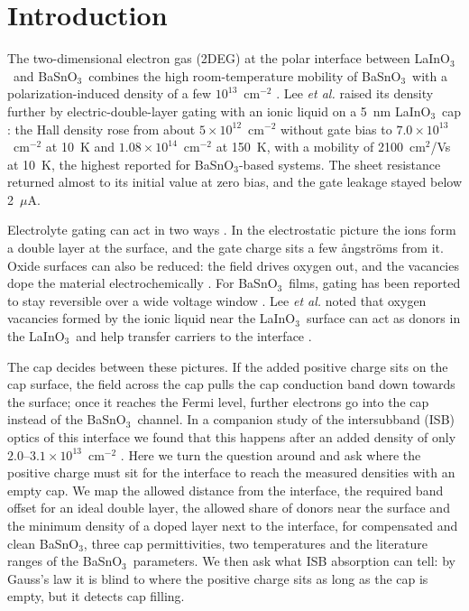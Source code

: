 \documentclass[11pt]{article}
\newcommand{\LIO}{\texorpdfstring{LaInO$_3$}{LaInO3}}
\newcommand{\BSO}{\texorpdfstring{BaSnO$_3$}{BaSnO3}}
\begin{document}
\section{Introduction}
The two-dimensional electron gas (2DEG) at the polar interface between \LIO\ and \BSO\ combines the high room-temperature mobility of \BSO\ with a polarization-induced density of a few $10^{13}$~cm$^{-2}$ \cite{Kim2019LIO,Aggoune2021}. Lee \emph{et al.} raised its density further by electric-double-layer gating with an ionic liquid on a 5~nm \LIO\ cap \cite{Lee2024LIO}: the Hall density rose from about $5\times10^{12}$~cm$^{-2}$ without gate bias to $7.0\times10^{13}$~cm$^{-2}$ at 10~K and $1.08\times10^{14}$~cm$^{-2}$ at 150~K, with a mobility of 2100~cm$^2$/Vs at 10~K, the highest reported for \BSO-based systems. The sheet resistance returned almost to its initial value at zero bias, and the gate leakage stayed below 2~$\mu$A.

Electrolyte gating can act in two ways \cite{Ueno2008,Bisri2017}. In the electrostatic picture the ions form a double layer at the surface, and the gate charge sits a few \aa ngstr\"oms from it. Oxide surfaces can also be reduced: the field drives oxygen out, and the vacancies dope the material electrochemically \cite{Jeong2013,Bisri2017}. For \BSO\ films, gating has been reported to stay reversible over a wide voltage window \cite{Wang2019BSO}. Lee \emph{et al.} noted that oxygen vacancies formed by the ionic liquid near the \LIO\ surface can act as donors in the \LIO\ and help transfer carriers to the interface \cite{Lee2024LIO}.

The cap decides between these pictures. If the added positive charge sits on the cap surface, the field across the cap pulls the cap conduction band down towards the surface; once it reaches the Fermi level, further electrons go into the cap instead of the \BSO\ channel. In a companion study of the intersubband (ISB) optics of this interface we found that this happens after an added density of only $2.0$--$3.1\times10^{13}$~cm$^{-2}$ \cite{OwnbyMAT01}. Here we turn the question around and ask where the positive charge must sit for the interface to reach the measured densities with an empty cap. We map the allowed distance from the interface, the required band offset for an ideal double layer, the allowed share of donors near the surface and the minimum density of a doped layer next to the interface, for compensated and clean \BSO, three cap permittivities, two temperatures and the literature ranges of the \BSO\ parameters. We then ask what ISB absorption can tell: by Gauss's law it is blind to where the positive charge sits as long as the cap is empty, but it detects cap filling.
\end{document}
